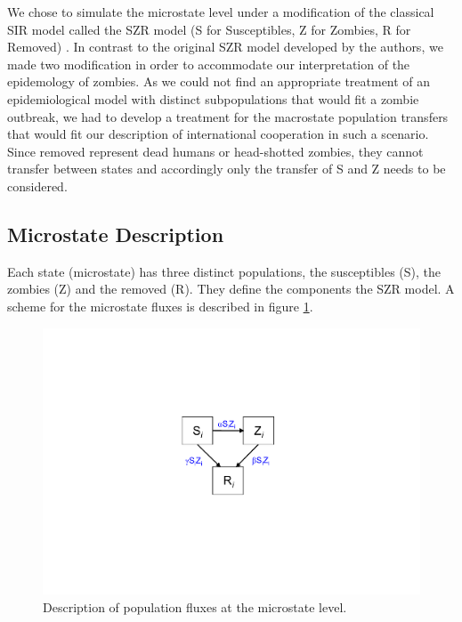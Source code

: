 \documentclass[11pt]{article} %
\begin{document}
We chose to simulate the microstate level under a modification of the classical SIR model called the SZR model (S for Susceptibles, Z for Zombies, R for Removed) \cite{munz2009zombies}. In contrast to the original SZR model developed by the authors, we made two modification in order to accommodate our interpretation of the epidemology of zombies. As we could not find an appropriate treatment of an epidemiological model with distinct subpopulations that would fit a zombie outbreak, we had to develop a treatment for the macrostate population transfers that would fit our description of international cooperation in such a scenario. Since removed represent dead humans or head-shotted zombies, they cannot transfer between states and accordingly only the transfer of S and Z needs to be considered. 

\subsection{Microstate Description}\indent
\label{sec:microdescription}

Each state (microstate) has three distinct populations, the susceptibles (S), the zombies (Z) and the removed (R). They define the components the SZR model. A scheme for the microstate fluxes is described in figure \ref{microstate}.

\begin{figure}[h!]
\centerline{
\includegraphics[scale=0.55]{../images/Powerpoint_figures/microstate.pdf}}
\caption{Description of population fluxes at the microstate level. \label{microstate} }
\end{figure}
\end{document}
